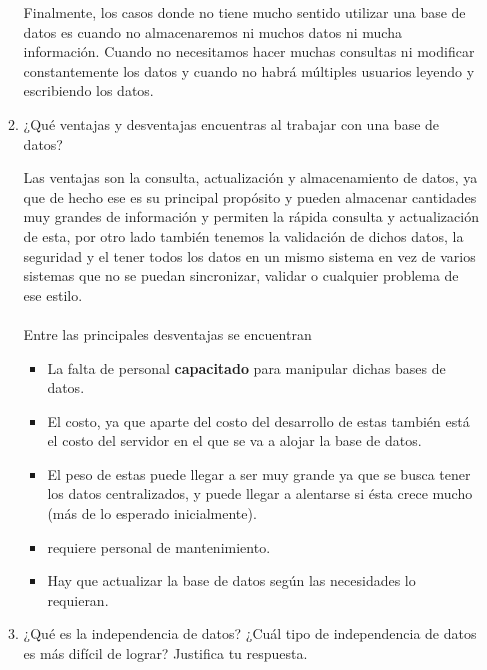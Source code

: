 \documentclass[12pt,a4paper]{article}
\begin{document}
\begin{enumerate}
\begin{enumerate}
				Finalmente, los casos donde no tiene mucho sentido utilizar una base de datos es cuando no almacenaremos ni muchos datos ni mucha información.
				Cuando no necesitamos hacer muchas consultas ni modificar constantemente los datos y cuando no habrá múltiples usuarios leyendo y escribiendo los datos.
				
			\pagebreak
			\item ¿Qué ventajas y desventajas encuentras al trabajar con una base de datos?
			
                        	Las ventajas son la consulta, actualización y almacenamiento de datos, ya que de hecho ese es su principal propósito y 			        pueden almacenar cantidades muy grandes de información y permiten la rápida consulta y actualización de esta, por otro                                   lado también tenemos la validación de dichos datos, la seguridad y el tener todos los datos en un mismo sistema en vez                                   de varios sistemas que no se puedan sincronizar, validar o cualquier problema de ese estilo.\\ \\
    
    			 	Entre las principales desventajas se encuentran\\
      				\begin{itemize}
     				\item La falta de personal \textbf{capacitado} para manipular dichas bases de datos.
   			        \item El costo, ya que aparte del costo del desarrollo de estas también está el costo del servidor en el que se va a 	                                 alojar la base de datos.
    				\item El peso de estas puede llegar a ser muy grande ya que se busca tener los datos centralizados, y puede llegar a                                     alentarse si ésta crece mucho (más de lo esperado inicialmente).
   			        \item requiere personal de mantenimiento.
                                \item Hay que actualizar la base de datos según las necesidades lo requieran.
                                \end{itemize}				
				
			\item ¿Qué es la independencia de datos? ¿Cuál tipo de independencia de datos es más difícil de lograr?
				Justifica tu respuesta.
				

\end{enumerate}
\end{enumerate}
\end{document}
